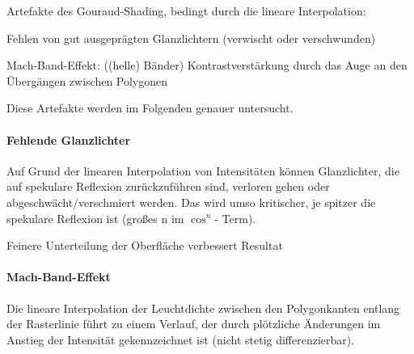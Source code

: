 \documentclass[landscape]{article}
\begin{document}
\begin{multicols}{3}
  
  Artefakte des Gouraud-Shading, bedingt durch die lineare Interpolation:
  \begin{itemize*}
    \item Fehlen von gut ausgeprägten Glanzlichtern (verwischt oder verschwunden)
    \item Mach-Band-Effekt: ((helle) Bänder) Kontrastverstärkung durch das Auge an den Übergängen zwischen Polygonen
    \item Diese Artefakte werden im Folgenden genauer untersucht.
  \end{itemize*}
  
  \paragraph{Fehlende Glanzlichter}
  Auf Grund der linearen Interpolation von Intensitäten können Glanzlichter, die auf spekulare Reflexion zurückzuführen sind, verloren gehen oder abgeschwächt/verschmiert werden. Das wird umso kritischer, je spitzer die spekulare Reflexion ist (großes n im $\cos^n$- Term).
  
  Feinere Unterteilung der Oberfläche verbessert Resultat
  
  
  \paragraph{Mach-Band-Effekt}
  Die lineare Interpolation der Leuchtdichte zwischen den Polygonkanten entlang der Rasterlinie führt zu einem Verlauf, der durch plötzliche Änderungen im Anstieg der Intensität gekennzeichnet ist (nicht stetig differenzierbar).
  

\end{multicols}
\end{document}
